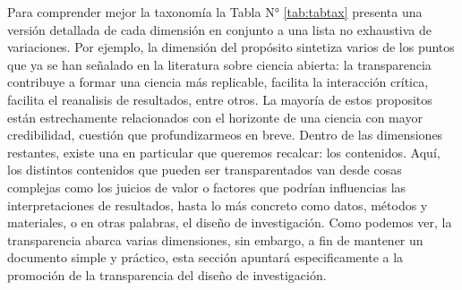 \documentclass[
]{book}
\begin{document}
Para comprender mejor la taxonomía la Tabla N° \ref{tab:tabtax} presenta una versión detallada de cada dimensión en conjunto a una lista no exhaustiva de variaciones. Por ejemplo, la dimensión del propósito sintetiza varios de los puntos que ya se han señalado en la literatura sobre ciencia abierta: la transparencia contribuye a formar una ciencia más replicable, facilita la interacción crítica, facilita el reanalisis de resultados, entre otros. La mayoría de estos propositos están estrechamente relacionados con el horizonte de una ciencia con mayor credibilidad, cuestión que profundizarmeos en breve. Dentro de las dimensiones restantes, existe una en particular que queremos recalcar: los contenidos. Aquí, los distintos contenidos que pueden ser transparentados van desde cosas complejas como los juicios de valor o factores que podrían influencias las interpretaciones de resultados, hasta lo más concreto como datos, métodos y materiales, o en otras palabras, el diseño de investigación. Como podemos ver, la transparencia abarca varias dimensiones, sin embargo, a fin de mantener un documento simple y práctico, esta sección apuntará especificamente a la promoción de la transparencia del diseño de investigación.
\end{document}
